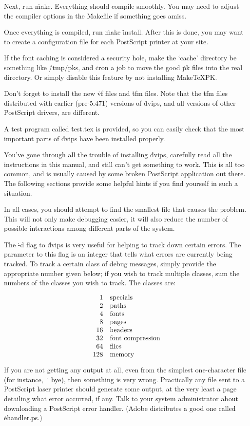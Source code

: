 Next, run \.{make}.  Everything should compile smoothly.  You may need
to adjust the compiler options in the \.{Makefile} if something goes
amiss.

Once everything is compiled, run \.{make} \.{install}.	After this is done,
you may want to create a configuration file for each PostScript printer
at your site.

If the font caching is considered a security hole, make the `cache'
directory be something like \.{/tmp/pks}, and \.{cron} a job to move the
good \.{pk} files into the real directory.  Or simply disable this
feature by not installing \.{MakeTeXPK}.

Don't forget to install the new \.{vf} files and \.{tfm} files.  Note
that the \.{tfm} files distributed with earlier (pre-5.471) versions
of \.{dvips}, and all versions of other PostScript drivers, are different.

A test program called \.{test.tex} is provided, so you can easily check
that the most important parts of \.{dvips} have been installed properly.


You've gone through all the trouble of installing \.{dvips}, carefully
read all the instructions in this manual, and still can't get something
to work.  This is all too common, and is usually caused by some broken
PostScript application out there.  The following sections provide some
helpful hints if you find yourself in such a situation.

In all cases, you should attempt to find the smallest file that causes
the problem.  This will not only make debugging easier, it will also
reduce the number of possible interactions among different parts of the
system.


The \.{-d} flag to \.{dvips} is very useful for helping to track down
certain errors.  The parameter to this flag is an integer that tells
what errors are currently being tracked.  To track a certain class of
debug messages, simply provide the appropriate number given below;
if you wish to track multiple classes, sum the numbers of the classes
you wish to track.  The classes are:

$$\vbox{\halign{\hfil #\quad&#\hfil\cr
1&specials\cr2&paths\cr4&fonts\cr8&pages\cr16&headers\cr
32&font compression\cr64&files\cr
128&memory\cr}}$$


If you are not getting any output at all, even from the simplest
one-character file (for instance, \.{~ bye}),
then something is very wrong.  Practically any file sent to a
PostScript laser printer should generate some output, at the very
least a page detailing what error occurred, if any.  Talk to your
system administrator about downloading a PostScript error handler.
(Adobe distributes a good one called \.{ehandler.ps}.)

